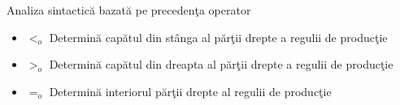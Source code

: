 \documentclass[pdf]{beamer}
\begin{document}
\begin{frame}{Analiza sintactică bazată pe precedenţa operator}
\begin{itemize}
\item
$<_o$ Determină capătul din stânga al părţii drepte a regulii de producţie
\item
$>_o$  Determină capătul din dreapta al părţii drepte a regulii de producţie
\item
$=_o$ Determină interiorul părţii drepte al regulii de producţie
\end{itemize}
\end{frame}



%
%
%
%
%
\end{document}
